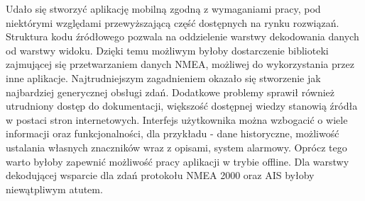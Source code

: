\documentclass[skorowidz,skroty]{dyplomWEZUT}
\begin{document}
\begin{zakonczenie}\label{chap:zakonczenie}
	Udało się stworzyć aplikację mobilną zgodną z wymaganiami pracy, pod niektórymi względami przewyższającą część dostępnych na rynku rozwiązań. Struktura kodu źródłowego pozwala na oddzielenie warstwy dekodowania danych od warstwy widoku. Dzięki temu możliwym byłoby dostarczenie biblioteki zajmującej się przetwarzaniem danych NMEA, możliwej do wykorzystania przez inne aplikacje. Najtrudniejszym zagadnieniem okazało się stworzenie jak najbardziej generycznej obsługi zdań. Dodatkowe problemy sprawił również utrudniony dostęp do dokumentacji, większość dostępnej wiedzy stanowią źródła w postaci stron internetowych. 
	Interfejs użytkownika można wzbogacić o wiele informacji oraz funkcjonalności, dla przykładu - dane historyczne, możliwość ustalania własnych znaczników wraz z opisami, system alarmowy. Oprócz tego warto byłoby zapewnić możliwość pracy aplikacji w trybie offline. Dla warstwy dekodującej wsparcie dla zdań protokołu NMEA 2000 oraz AIS byłoby niewątpliwym atutem.
\end{zakonczenie}

\printbibliography[heading=bibintoc]

\listoftables

\listoffigures

\listoflistings


\printindex
\end{document}
